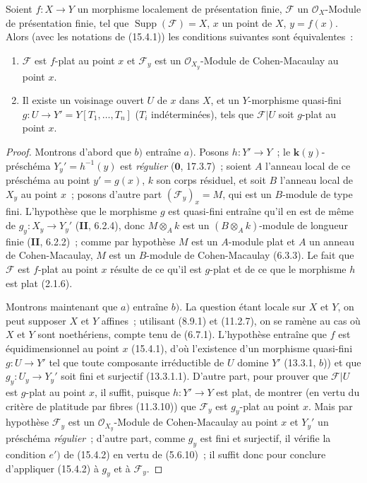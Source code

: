 \begin{proposition}[15.4.3]
\label{IV.15.4.3-fr}
Soient $f:X\to Y$ un morphisme localement de présentation finie, $\mathcal F$ un
$\mathcal O_X$-Module de présentation finie, tel que
$\operatorname{Supp}(\mathcal F)=X$, $x$ un point de $X$, $y=f(x)$. Alors \textup{(avec
les notations de (15.4.1))} les conditions suivantes sont équivalentes~:
\begin{enumerate}[label=\emph{\alph*})]
  \item $\mathcal F$ est $f$-plat au point $x$ et $\mathcal F_y$ est un
  $\mathcal O_{X_y}$-Module de Cohen-Macaulay au point $x$.
  \item Il existe un voisinage ouvert $U$ de $x$ dans $X$, et un $Y$-morphisme
  quasi-fini $g:U\to Y'=Y[T_1,\ldots,T_n]$ ($T_i$ indéterminées), tels que
  $\mathcal F|U$ soit $g$-plat au point $x$.
\end{enumerate}
\end{proposition}

\begin{proof}
Montrons d'abord que $b)$ entraîne $a)$. Posons $h:Y'\to Y$~; le
$\boldsymbol{k}(y)$-préschéma $Y_y'=h^{-1}(y)$ est \emph{régulier}
($\mathbf{0}$, 17.3.7)~; soient $A$ l'anneau local de ce préschéma
au point $y'=g(x)$, $k$ son corps résiduel, et soit $B$ l'anneau local de $X_y$
au point $x$~; posons d'autre part $(\mathcal F_y)_x=M$, qui est un $B$-module
de type fini. L'hypothèse que le morphisme $g$ est quasi-fini entraîne qu'il en
est de même de $g_y:X_y\to Y_y'$ (\textbf{II}, 6.2.4), donc $M\otimes_A k$ est
un $(B\otimes_A k)$-module de longueur finie (\textbf{II}, 6.2.2)~; comme par
hypothèse $M$ est un $A$-module plat et $A$ un anneau de Cohen-Macaulay, $M$ est
un $B$-module de Cohen-Macaulay (6.3.3). Le fait que $\mathcal F$ est $f$-plat
au point $x$ résulte de ce qu'il est $g$-plat et de ce que le morphisme $h$ est
plat (2.1.6).

Montrons maintenant que $a)$ entraîne $b)$. La question étant locale sur $X$ et
$Y$, on peut supposer $X$ et $Y$ affines~; utilisant (8.9.1) et (11.2.7), on se
ramène au cas où $X$ et $Y$ sont noethériens, compte tenu de (6.7.1).
L'hypothèse entraîne que $f$ est
équidimensionnel au point $x$ (15.4.1), d'où l'existence d'un morphisme
quasi-fini $g:U\to Y'$ tel que toute composante irréductible de $U$ domine $Y'$
(13.3.1, $b$)) et que $g_y:U_y\to Y_y'$ soit fini et surjectif (13.3.1.1).
D'autre part, pour prouver que $\mathcal F|U$ est $g$-plat au point $x$, il
suffit, puisque $h:Y'\to Y$ est plat, de montrer (en vertu du critère de
platitude par fibres (11.3.10)) que $\mathcal F_y$ est $g_y$-plat au point $x$.
Mais par hypothèse $\mathcal F_y$ est un $\mathcal O_{X_y}$-Module de
Cohen-Macaulay au point $x$ et $Y_y'$ un préschéma \emph{régulier}~; d'autre
part, comme $g_y$ est fini et surjectif, il vérifie la condition $e')$ de
(15.4.2) en vertu de (5.6.10)~; il suffit donc pour conclure d'appliquer (15.4.2)
à $g_y$ et à $\mathcal F_y$.
\end{proof}

